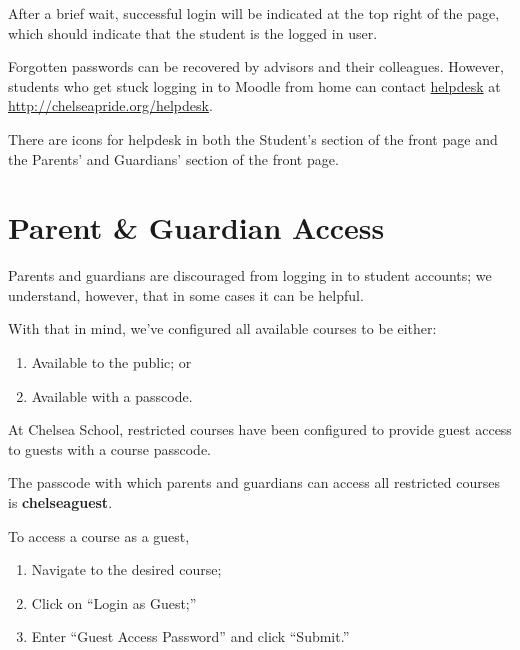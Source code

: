 \documentclass[letterpaper,10pt,english]{sphinxmanual}
\begin{document}
After a brief wait, successful login will be indicated at the top right of the page, which should indicate that the student is the logged in user.

Forgotten passwords can be recovered by advisors and their colleagues. However, students who get stuck logging in to Moodle from home can contact \href{http://chelseapride.org/helpdesk}{helpdesk} at \href{http://chelseapride.org/helpdesk}{http://chelseapride.org/helpdesk}.

There are icons for helpdesk in both the Student's section of the front page and the Parents' and Guardians' section of the front page.


\section{Parent \& Guardian Access}
\label{moodle:parent-guardian-access}
Parents and guardians are discouraged from logging in to student accounts; we understand, however, that in some cases it can be helpful.

With that in mind, we've configured all available courses to be either:
\begin{enumerate}
\item {} 
Available to the public; or

\item {} 
Available with a passcode.

\end{enumerate}

At Chelsea School, restricted courses have been configured to provide guest access to guests with a course passcode.

The passcode with which parents and guardians can access all restricted courses is \textbf{chelseaguest}.

To access a course as a guest,
\begin{enumerate}
\item {} 
Navigate to the desired course;

\item {} 
Click on ``Login as Guest;''

\item {} 
Enter ``Guest Access Password'' and click ``Submit.''

\end{enumerate}
\end{document}
